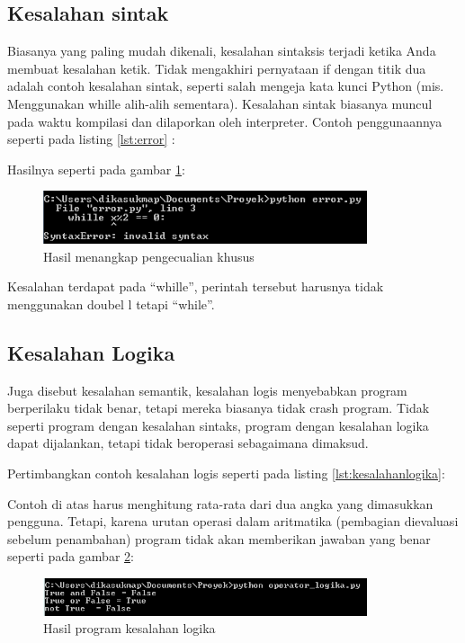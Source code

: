 \subsection{Kesalahan sintak} 
Biasanya yang paling mudah dikenali, kesalahan sintaksis terjadi ketika Anda membuat kesalahan ketik. Tidak mengakhiri pernyataan if dengan titik dua adalah contoh kesalahan sintak, seperti salah mengeja kata kunci Python (mis. Menggunakan whille alih-alih sementara). Kesalahan sintak biasanya muncul pada waktu kompilasi dan dilaporkan oleh interpreter. 
Contoh penggunaannya seperti pada listing \ref{lst:error} :


Hasilnya seperti pada gambar \ref{fig:error}:
\begin{figure}[!htbp]
	\centerline{\includegraphics[width=0.85\textwidth]{figures/2/error.PNG}}
	\caption{Hasil menangkap pengecualian khusus}
	\label{fig:error}
\end{figure}
Kesalahan terdapat pada “whille”, perintah tersebut harusnya tidak menggunakan doubel l tetapi “while”.

\subsection{Kesalahan Logika}
Juga disebut kesalahan semantik, kesalahan logis menyebabkan program berperilaku tidak benar, tetapi mereka biasanya tidak crash program. Tidak seperti program dengan kesalahan sintaks, program dengan kesalahan logika dapat dijalankan, tetapi tidak beroperasi sebagaimana dimaksud. 

Pertimbangkan contoh kesalahan logis seperti pada listing \ref{lst:kesalahanlogika}:


Contoh di atas harus menghitung rata-rata dari dua angka yang dimasukkan pengguna. Tetapi, karena urutan operasi dalam aritmatika (pembagian dievaluasi sebelum penambahan) program tidak akan memberikan jawaban yang benar seperti pada gambar \ref{fig:salahlogika}:
\begin{figure}[!htbp]
	\centerline{\includegraphics[width=0.85\textwidth]{figures/2/salahlogika.PNG}}
	\caption{Hasil program kesalahan logika}
	\label{fig:salahlogika}
\end{figure}

